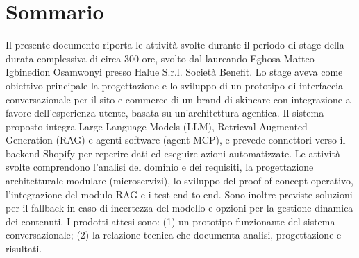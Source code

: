 \cleardoublepage
{}
{}
\begingroup
\let\clearpage\relax
\let\cleardoublepage\relax
\let\cleardoublepage\relax

\chapter*{Sommario}

Il presente documento riporta le attività svolte durante il periodo di stage della durata complessiva di circa 300 ore, svolto dal laureando Eghosa Matteo Igbinedion Osamwonyi presso Halue S.r.l. Società Benefit.  
Lo stage aveva come obiettivo principale la progettazione e lo sviluppo di un prototipo di interfaccia conversazionale per il sito e-commerce di un brand di skincare con integrazione a favore dell'esperienza utente, basata su un'architettura agentica. Il sistema proposto integra Large Language Models (LLM), Retrieval-Augmented Generation (RAG) e agenti software (agent MCP), e prevede connettori verso il backend Shopify per reperire dati ed eseguire azioni automatizzate.  
Le attività svolte comprendono l'analisi del dominio e dei requisiti, la progettazione architetturale modulare (microservizi), lo sviluppo del proof-of-concept operativo, l'integrazione del modulo RAG e i test end-to-end. Sono inoltre previste soluzioni per il fallback in caso di incertezza del modello e opzioni per la gestione dinamica dei contenuti.  
I prodotti attesi sono: (1) un prototipo funzionante del sistema conversazionale; (2) la relazione tecnica che documenta analisi, progettazione e risultati.

\endgroup

\vfill
